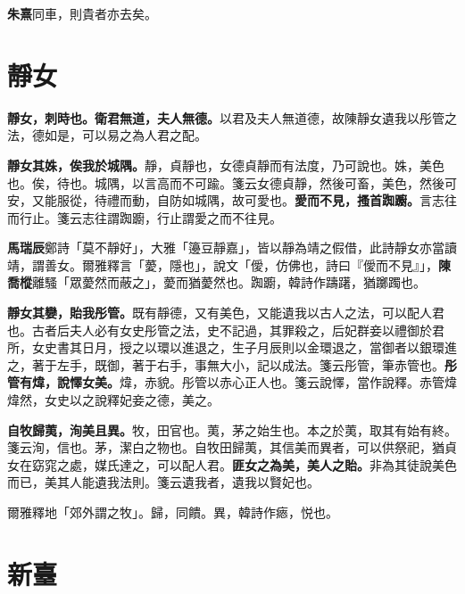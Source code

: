 \begin{quoting}\textbf{朱熹}同車，則貴者亦去矣。\end{quoting}

\section{靜女}


\textbf{靜女，刺時也。衛君無道，夫人無德。}{\footnotesize 以君及夫人無道德，故陳靜女遺我以彤管之法，德如是，可以易之為人君之配。}

\textbf{靜女其姝，俟我於城隅。}{\footnotesize 靜，貞靜也，女德貞靜而有法度，乃可說也。姝，美色也。俟，待也。城隅，以言高而不可踰。箋云女德貞靜，然後可畜，美色，然後可安，又能服從，待禮而動，自防如城隅，故可愛也。}\textbf{愛而不見，搔首踟躕。}{\footnotesize 言志往而行止。箋云志往謂踟躕，行止謂愛之而不往見。}

\begin{quoting}\textbf{馬瑞辰}鄭詩「莫不靜好」，大雅「籩豆靜嘉」，皆以靜為靖之假借，此詩靜女亦當讀靖，謂善女。爾雅釋言「薆，隱也」，說文「僾，仿佛也，詩曰『僾而不見』」，\textbf{陳喬樅}離騷「眾薆然而蔽之」，薆而猶薆然也。踟躕，韓詩作躊躇，猶躑躅也。\end{quoting}

\textbf{靜女其孌，貽我彤管。}{\footnotesize 既有靜德，又有美色，又能遺我以古人之法，可以配人君也。古者后夫人必有女史彤管之法，史不記過，其罪殺之，后妃群妾以禮御於君所，女史書其日月，授之以環以進退之，生子月辰則以金環退之，當御者以銀環進之，著于左手，既御，著于右手，事無大小，記以成法。箋云彤管，筆赤管也。}\textbf{彤管有煒，說懌女美。}{\footnotesize 煒，赤貌。彤管以赤心正人也。箋云說懌，當作說釋。赤管煒煒然，女史以之說釋妃妾之德，美之。}

\textbf{自牧歸荑，洵美且異。}{\footnotesize 牧，田官也。荑，茅之始生也。本之於荑，取其有始有終。箋云洵，信也。茅，潔白之物也。自牧田歸荑，其信美而異者，可以供祭祀，猶貞女在窈窕之處，媒氏達之，可以配人君。}\textbf{匪女之為美，美人之貽。}{\footnotesize 非為其徒說美色而已，美其人能遺我法則。箋云遺我者，遺我以賢妃也。}

\begin{quoting}爾雅釋地「郊外謂之牧」。歸，同饋。異，韓詩作瘱，悦也。\end{quoting}

\section{新臺}

